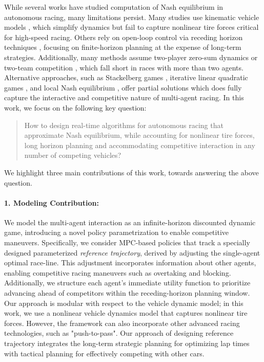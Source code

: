 While several works have studied computation of Nash equilibrium in autonomous racing, 
many limitations persist. Many studies use kinematic vehicle models \citep{notomista2020enhancing, wang2019bgame, wang2021game, liniger2019noncooperative, jia2023rapid, williams2017autonomous, sinha2020formulazero, schwarting2021stochastic}, which simplify dynamics but fail to capture nonlinear tire forces critical for high-speed racing. Others rely on open-loop control via receding horizon techniques \citep{buyval2017deriving, jung2021game, wang2019bgame, wang2021game, liniger2019noncooperative, jia2023rapid, schwarting2021stochastic, zhu2023sequential, zhu2024sequential}, focusing on finite-horizon planning at the expense of long-term strategies. Additionally, many methods assume two-player zero-sum dynamics \citep{wang2019bgame, thakkar2022hierarchical, kalaria2023towards} or two-team competition \citep{thakkar2024hierarchical}, which fall short in races with more than two agents. Alternative approaches, such as Stackelberg games \citep{notomista2020enhancing, liniger2019noncooperative}, iterative linear quadratic games \citep{schwarting2021stochastic}, and local Nash equilibrium \citep{zhu2023sequential, zhu2024sequential}, offer partial solutions which does fully capture the interactive and competitive nature of multi-agent racing. 
In this work, we focus on the following key question:
\begin{quote}
    How to design real-time algorithms for  autonomous racing that approximate Nash equilibrium, while accounting for nonlinear tire forces, long horizon planning and accommodating competitive interaction in any number of competing vehicles?
\end{quote}
We highlight three main contributions of this work, towards answering the above question.  

\paragraph{1. Modeling Contribution:} We model the multi-agent interaction as an infinite-horizon discounted dynamic game, introducing a novel policy parametrization to enable competitive maneuvers. Specifically, we consider MPC-based policies that track a specially designed parameterized \textit{reference trajectory}, derived by adjusting the single-agent optimal race-line. This adjustment incorporates information about other agents, enabling competitive racing maneuvers such as overtaking and blocking. Additionally, we structure each agent’s immediate utility function to prioritize advancing ahead of competitors within the receding-horizon planning window. Our approach is modular with respect to the vehicle dynamic model; in this work, we use a nonlinear vehicle dynamics model that captures nonlinear tire forces. However, the framework can also incorporate other advanced racing technologies, such as "push-to-pass". Our approach of designing reference trajectory integrates the long-term strategic planning for optimizing lap times with tactical planning for effectively competing with other cars.
